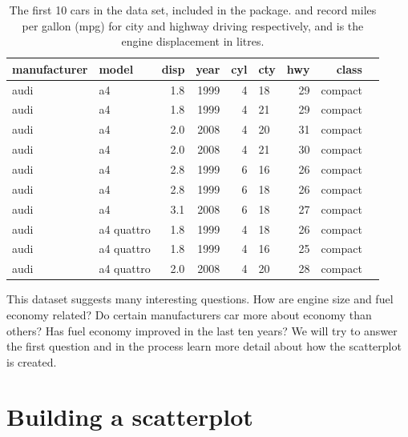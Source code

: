 \begin{table}
  \begin{center}
  \begin{tabular}{llrrrlrrl}
    \toprule
    manufacturer & model & disp & year & cyl & cty & hwy & class \\
    \midrule
    audi & a4         & 1.8 & 1999 & 4 & 18 & 29 & compact\\
    audi & a4         & 1.8 & 1999 & 4 & 21 & 29 & compact\\
    audi & a4         & 2.0 & 2008 & 4 & 20 & 31 & compact\\
    audi & a4         & 2.0 & 2008 & 4 & 21 & 30 & compact\\
    audi & a4         & 2.8 & 1999 & 6 & 16 & 26 & compact\\
    audi & a4         & 2.8 & 1999 & 6 & 18 & 26 & compact\\
    audi & a4         & 3.1 & 2008 & 6 & 18 & 27 & compact\\
    audi & a4 quattro & 1.8 & 1999 & 4 & 18 & 26 & compact\\
    audi & a4 quattro & 1.8 & 1999 & 4 & 16 & 25 & compact\\
    audi & a4 quattro & 2.0 & 2008 & 4 & 20 & 28 & compact\\
        \bottomrule
  \end{tabular}
  \end{center}
  \caption{The first 10 cars in the  data set, included in the \ggplot package.   and  record miles per gallon (mpg) for city and highway driving respectively, and  is the engine displacement in litres.}
  \label{tbl:mpg}
\end{table}

This dataset suggests many interesting questions.  How are engine size and fuel economy related?  Do certain manufacturers car more about economy than others? Has fuel economy improved in the last ten years?  We will try to answer the first question and in the process learn more detail about how the scatterplot is created.

\section{Building a scatterplot}
\label{sec:simple-plot}

